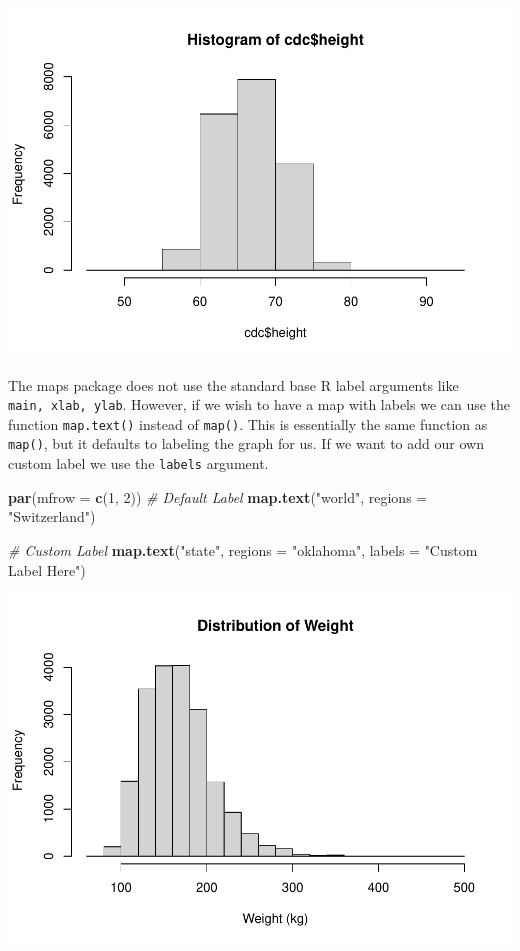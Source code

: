 \documentclass[
]{book}
\newenvironment{Shaded}{\begin{snugshade}}{\end{snugshade}}
\newcommand{\CommentTok}[1]{\textcolor[rgb]{0.56,0.35,0.01}{\textit{#1}}}
\newcommand{\DataTypeTok}[1]{\textcolor[rgb]{0.13,0.29,0.53}{#1}}
\newcommand{\DecValTok}[1]{\textcolor[rgb]{0.00,0.00,0.81}{#1}}
\newcommand{\KeywordTok}[1]{\textcolor[rgb]{0.13,0.29,0.53}{\textbf{#1}}}
\newcommand{\NormalTok}[1]{#1}
\newcommand{\StringTok}[1]{\textcolor[rgb]{0.31,0.60,0.02}{#1}}
\begin{document}
\includegraphics{_main_files/figure-latex/unnamed-chunk-196-1.pdf}

The maps package does not use the standard base R label arguments like \texttt{main,\ xlab,\ ylab}. However, if we wish to have a map with labels we can use the function \texttt{map.text()} instead of \texttt{map()}. This is essentially the same function as \texttt{map()}, but it defaults to labeling the graph for us. If we want to add our own custom label we use the \texttt{labels} argument.

\begin{Shaded}
\begin{Highlighting}[]
\KeywordTok{par}\NormalTok{(}\DataTypeTok{mfrow =} \KeywordTok{c}\NormalTok{(}\DecValTok{1}\NormalTok{, }\DecValTok{2}\NormalTok{))}
\CommentTok{# Default Label}
\KeywordTok{map.text}\NormalTok{(}\StringTok{"world"}\NormalTok{, }\DataTypeTok{regions =} \StringTok{"Switzerland"}\NormalTok{)}

\CommentTok{# Custom Label}
\KeywordTok{map.text}\NormalTok{(}\StringTok{"state"}\NormalTok{, }\DataTypeTok{regions =} \StringTok{"oklahoma"}\NormalTok{, }\DataTypeTok{labels =} \StringTok{"Custom Label Here"}\NormalTok{)}
\end{Highlighting}
\end{Shaded}

\includegraphics{_main_files/figure-latex/unnamed-chunk-197-1.pdf}
\end{document}
